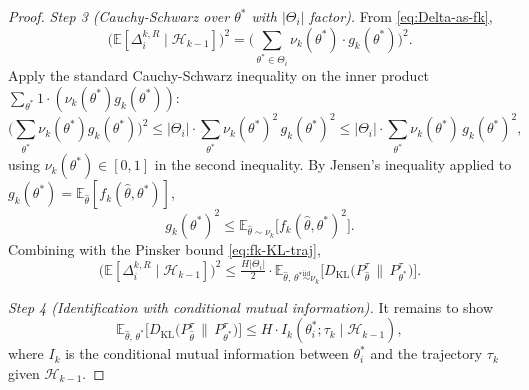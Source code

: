\documentclass{article}
\begin{document}
\begin{proof}
\textit{Step 3 (Cauchy-Schwarz over $\theta^*$ with $|\Theta_i|$ factor).} From \eqref{eq:Delta-as-fk},
\begin{equation}
\big(\mathbb{E}[\Delta_i^{k,R} \mid \mathcal{H}_{k-1}]\big)^2 = \bigg(\sum_{\theta^* \in \Theta_i} \nu_k(\theta^*) \cdot g_k(\theta^*)\bigg)^2.
\end{equation}
Apply the standard Cauchy-Schwarz inequality on the inner product $\sum_{\theta^*} 1 \cdot (\nu_k(\theta^*) g_k(\theta^*))$:
\begin{equation}
\bigg(\sum_{\theta^*} \nu_k(\theta^*) g_k(\theta^*)\bigg)^2 \leq |\Theta_i| \cdot \sum_{\theta^*} \nu_k(\theta^*)^2 \, g_k(\theta^*)^2 \leq |\Theta_i| \cdot \sum_{\theta^*} \nu_k(\theta^*) \, g_k(\theta^*)^2,
\end{equation}
using $\nu_k(\theta^*) \in [0, 1]$ in the second inequality. By Jensen's inequality applied to $g_k(\theta^*) = \mathbb{E}_{\hat{\theta}}[f_k(\hat{\theta}, \theta^*)]$,
\begin{equation}
g_k(\theta^*)^2 \leq \mathbb{E}_{\hat{\theta} \sim \nu_k}\big[f_k(\hat{\theta}, \theta^*)^2\big].
\end{equation}
Combining with the Pinsker bound \eqref{eq:fk-KL-traj},
\begin{equation}
\label{eq:Delta-squared-bound}
\big(\mathbb{E}[\Delta_i^{k,R} \mid \mathcal{H}_{k-1}]\big)^2 \leq \tfrac{H |\Theta_i|}{2} \cdot \mathbb{E}_{\hat{\theta},\, \theta^* \overset{\text{iid}}{\sim} \nu_k}\big[D_{\mathrm{KL}}\big(P_{\hat{\theta}}^{\tau} \,\big\|\, P_{\theta^*}^{\tau}\big)\big].
\end{equation}

\textit{Step 4 (Identification with conditional mutual information).} It remains to show
\begin{equation}
\label{eq:KL-MI-bound}
\mathbb{E}_{\hat{\theta},\, \theta^*}\big[D_{\mathrm{KL}}\big(P_{\hat{\theta}}^{\tau} \,\big\|\, P_{\theta^*}^{\tau}\big)\big] \leq H \cdot I_k(\theta_i^*; \tau_k \mid \mathcal{H}_{k-1}),
\end{equation}
where $I_k$ is the conditional mutual information between $\theta_i^*$ and the trajectory $\tau_k$ given $\mathcal{H}_{k-1}$.


\end{proof}
\end{document}
